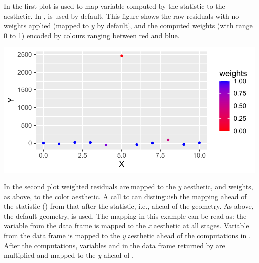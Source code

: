 \documentclass[krantz2]{krantz}\usepackage{knitr}
\begin{document}
In the first plot  is used to map variable  computed by the statistic to the  aesthetic. In ,  is used by default. This figure shows the raw residuals with no weights applied (mapped to $y$ by default), and the computed weights (with range 0 to 1) encoded by colours ranging between red and blue.

\begin{knitrout}\footnotesize
{}\color{fgcolor}\begin{kframe}
\begin{alltt}
\hlstd{(}   \hlstd{=} \hlstd{(}    \hlopt{+}
  \hlstd{(}  \hlopt{~}  \hlstd{,}  \hlstd{=} \hlstd{),}  \hlstd{=} \hlstd{,}
                      \hlstd{=} \hlstd{(} \hlstd{=} 
                      \hlstd{=} \hlstd{)} \hlopt{+}
  \hlstd{(} \hlstd{=} \hlstd{,}  \hlstd{=} \hlstd{,}  \hlstd{=} \hlstd{(}\hlstd{,} \hlstd{),}
                        \hlstd{=} \hlstd{)}
\end{alltt}
\end{kframe}

{\centering \includegraphics[width=.7\textwidth]{figure/pos-mapping-stage-02-1} 

}


\end{knitrout}

In the second plot weighted residuals are mapped to the $y$ aesthetic, and weights, as above, to the color aesthetic. A call to  can distinguish the mapping ahead of the statistic () from that after the statistic, i.e., ahead of the geometry. As above, the default geometry,  is used. The mapping in this example can be read as: the variable  from the data frame  is mapped to the \textit{x} aesthetic at all stages. Variable  from the data frame  is mapped to the \textit{y} aesthetic ahead of the computations in . After the computations, variables  and  in the data frame returned by  are multiplied and mapped to the \textit{y} ahead of .\label{chunk:plot:weighted:resid}
\end{document}
